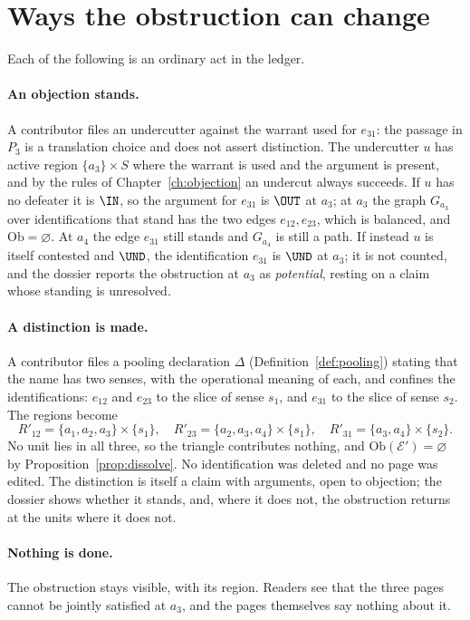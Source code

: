 \section{Ways the obstruction can change}\label{sec:case1repairs}

Each of the following is an ordinary act in the ledger.

\paragraph{An objection stands.} A contributor files an undercutter against the warrant used for $e_{31}$: the passage in $P_3$ is a translation choice and does not assert distinction. The undercutter $u$ has active region $\{a_3\}\times S$ where the warrant is used and the argument is present, and by the rules of Chapter~\ref{ch:objection} an undercut always succeeds. If $u$ has no defeater it is $\IN$, so the argument for $e_{31}$ is $\OUT$ at $a_3$; at $a_3$ the graph $G_{a_3}$ over identifications that stand has the two edges $e_{12},e_{23}$, which is balanced, and $\mathrm{Ob}=\varnothing$. At $a_4$ the edge $e_{31}$ still stands and $G_{a_4}$ is still a path. If instead $u$ is itself contested and $\UND$, the identification $e_{31}$ is $\UND$ at $a_3$; it is not counted, and the dossier reports the obstruction at $a_3$ as \emph{potential}, resting on a claim whose standing is unresolved.

\paragraph{A distinction is made.} A contributor files a pooling declaration $\Delta$ (Definition~\ref{def:pooling}) stating that the name has two senses, with the operational meaning of each, and confines the identifications: $e_{12}$ and $e_{23}$ to the slice of sense $s_1$, and $e_{31}$ to the slice of sense $s_2$. The regions become
\[
R'_{12}=\{a_1,a_2,a_3\}\times\{s_1\},\quad R'_{23}=\{a_2,a_3,a_4\}\times\{s_1\},\quad R'_{31}=\{a_3,a_4\}\times\{s_2\}.
\]
No unit lies in all three, so the triangle contributes nothing, and $\mathrm{Ob}(\mathcal E')=\varnothing$ by Proposition~\ref{prop:dissolve}. No identification was deleted and no page was edited. The distinction is itself a claim with arguments, open to objection; the dossier shows whether it stands, and, where it does not, the obstruction returns at the units where it does not.

\paragraph{Nothing is done.} The obstruction stays visible, with its region. Readers see that the three pages cannot be jointly satisfied at $a_3$, and the pages themselves say nothing about it.

